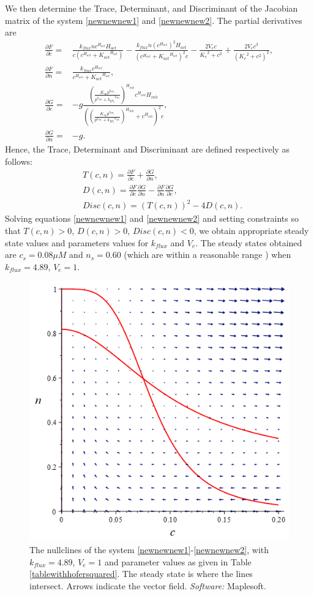 We then determine the Trace, Determinant, and Discriminant of the Jacobian matrix of the system \eqref{newnewnew1} and \eqref{newnewnew2}. The partial derivatives are
\begin{align}
    \frac{\partial F}{\partial c}=&\frac{k_{flux}nc^{H_{act}}H_{act}}{c(c^{H_{act}}+{K_{act}}^{H_{act}})}-\frac{k_{flux}n(c^{H_{act}})^2{H_{act}}}{(c^{H_{act}}+{K_{act}}^{H_{act}})^2c}-\frac{2V_ec}{{K_e}^2+c^2}+\frac{2{V_e}c^3}{({K_e}^2+c^2)^2},\\
    \frac{\partial F}{\partial n}=&\frac{k_{flux}c^{H_{act}}}{c^{H_{act}}+{K_{act}}^{H_{act}}},\\
    \frac{\partial G}{\partial c}=&-g\frac{\left(\frac{K_{\infty}p^{h_{IP_3}}}{{p^{h_{IP_3}}+{k_{IP_3}}}^{h_{IP_3}}}\right)^{H_{inh}}c^{H_{inh}}H_{inh}}{\left(\left(\frac{K_{\infty}p^{h_{IP_3}}}{p^{h_{IP_3}}+{k_{IP_3}}^{h_{IP_3}}}\right)^{H_{inh}}+c^{H_{inh}}\right)^2c},\\
    \frac{\partial G}{\partial n}=&-g.
\end{align}
Hence, the Trace, Determinant and Discriminant are defined respectively as follows:
\begin{align}
    &T(c,n)=\frac{\partial F}{\partial c}+\frac{\partial G}{\partial n},\nonumber\\
    &D(c,n)=\frac{\partial F}{\partial c}\frac{\partial G}{\partial n}-\frac{\partial F}{\partial n}\frac{\partial G}{\partial c},\nonumber\\
    &Disc(c,n)=(T(c,n))^2-4D(c,n).\nonumber
\end{align}
Solving equations \eqref{newnewnew1} and \eqref{newnewnew2} and setting constraints so that $T(c,n)>0$, $D(c,n)>0$, $Disc(c,n)<0$, we obtain appropriate steady state values and parameters values for $k_{flux}$ and $V_e$. The steady states obtained are $c_s = 0.08 \mu M$ and $n_s = 0.60$ (which are within a reasonable range \cite{Berridge,kline,karl}) when $k_{flux}=4.89$, $V_e=1$.

\begin{figure}[h!!!t!!!b!!!p]
  \centering
  \includegraphics[width=0.6\linewidth]{Chapters/5_New_Model/extras/A_vectorfield.png}
  \caption{The nullclines of the system \eqref{newnewnew1}-\eqref{newnewnew2}, with $k_{flux}=4.89$, $V_e=1$ and parameter values as given in Table \ref{tablewithhofersquared}. The steady state is where the lines intersect. {Arrows indicate the vector field.} \textit{Software:} Maplesoft.}
\end{figure}

